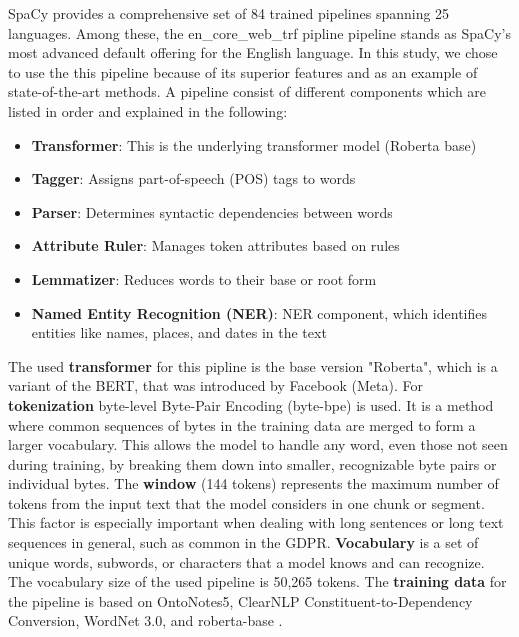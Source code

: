 SpaCy provides a comprehensive set of 84 trained pipelines spanning 25 languages. Among these, the en\_core\_web\_trf pipline pipeline stands as SpaCy's most advanced default offering for the English language. In this study, we chose to use the this pipeline because of its superior features and as an example of state-of-the-art methods. A pipeline consist of different components which are listed in order and explained in the following:
\begin{itemize}
    \item \textbf{Transformer}: This is the underlying transformer model (Roberta base)
    \item \textbf{Tagger}: Assigns part-of-speech (POS) tags to words
    \item \textbf{Parser}: Determines syntactic dependencies between words
    \item \textbf{Attribute Ruler}: Manages token attributes based on rules
    \item \textbf{Lemmatizer}: Reduces words to their base or root form
    \item \textbf{Named Entity Recognition (NER)}: NER component, which identifies entities like names, places, and dates in the text
\end{itemize}

The used \textbf{transformer} for this pipline is the base version "Roberta", which is a variant of the BERT, that was introduced by Facebook (Meta).  For \textbf{tokenization} byte-level Byte-Pair Encoding (byte-bpe) is used. It is a method where common sequences of bytes in the training data are merged to form a larger vocabulary. This allows the model to handle any word, even those not seen during training, by breaking them down into smaller, recognizable byte pairs or individual bytes. The \textbf{window} (144 tokens) represents the maximum number of tokens from the input text that the model considers in one chunk or segment. This factor is especially important when dealing with long sentences or long text sequences in general, such as common in the GDPR. \textbf{Vocabulary} is a set of unique words, subwords, or characters that a model knows and can recognize. The vocabulary size of the used pipeline is 50,265 tokens. The \textbf{training data} for the pipeline is based on OntoNotes5, ClearNLP Constituent-to-Dependency Conversion, WordNet 3.0, and roberta-base \cite{EnglishSpaCyModels}.



